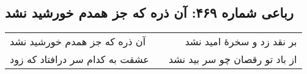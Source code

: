 \begin{center}
\section*{رباعی شماره ۴۶۹: آن ذره که جز همدم خورشید نشد}
\label{sec:0469}
\begin{longtable}{l p{0.5cm} r}
آن ذره که جز همدم خورشید نشد
&&
بر نقد زد و سخرهٔ امید نشد
\\
عشقت به کدام سر درافتاد که زود
&&
از باد تو رقصان چو سر بید نشد
\\
\end{longtable}
\end{center}

